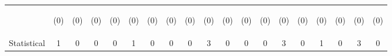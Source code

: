 \begin{tabular}{lcccccccccccccccccc}
 & \begin{footnotesize}(0)\end{footnotesize} & \begin{footnotesize}(0)\end{footnotesize} & \begin{footnotesize}(0)\end{footnotesize} & \begin{footnotesize}(0)\end{footnotesize} & \begin{footnotesize}(0)\end{footnotesize} & \begin{footnotesize}(0)\end{footnotesize} & \begin{footnotesize}(0)\end{footnotesize} & \begin{footnotesize}(0)\end{footnotesize} & \begin{footnotesize}(0)\end{footnotesize} & \begin{footnotesize}(0)\end{footnotesize} & \begin{footnotesize}(0)\end{footnotesize} & \begin{footnotesize}(0)\end{footnotesize} & \begin{footnotesize}(0)\end{footnotesize} & \begin{footnotesize}(0)\end{footnotesize} & \begin{footnotesize}(0)\end{footnotesize} & \begin{footnotesize}(0)\end{footnotesize} & \begin{footnotesize}(0)\end{footnotesize} & \begin{footnotesize}(0)\end{footnotesize}\\
\noalign{\smallskip}Statistical & 1 & 0 & 0 & 0 & 1 & 0 & 0 & 0 & 3 & 0 & 0 & 0 & 3 & 0 & 1 & 0 & 3 & 0\\

\end{tabular}
